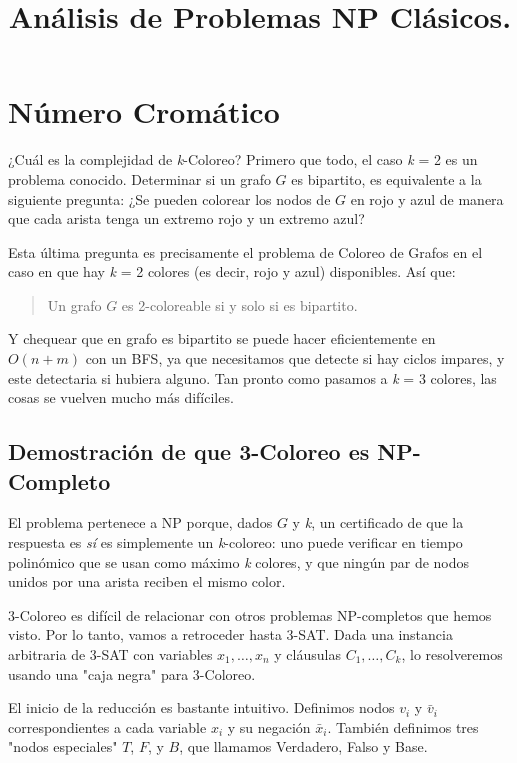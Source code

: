 \documentclass[12pt]{article}
\title{Análisis de Problemas NP Clásicos.}
\author{}
\date{}
\begin{document}
\maketitle

\section*{Número Cromático}

¿Cuál es la complejidad de \textit{k}-Coloreo? Primero que todo, el caso \textit{k} = 2 es un problema conocido. Determinar si un grafo $G$ es bipartito, es equivalente a la siguiente pregunta: ¿Se pueden colorear los nodos de $G$ en rojo y azul de manera que cada arista tenga un extremo rojo y un extremo azul?

Esta última pregunta es precisamente el problema de Coloreo de Grafos en el caso en que hay \textit{k} = 2 colores (es decir, rojo y azul) disponibles. Así que:

\begin{quote}
Un grafo $G$ es 2-coloreable si y solo si es bipartito.
\end{quote}

Y chequear que en grafo es bipartito se puede hacer eficientemente en $O(n+m)$ con un BFS, ya que necesitamos que detecte si hay ciclos impares, y este detectaria si hubiera alguno. Tan pronto como pasamos a \textit{k} = 3 colores, las cosas se vuelven mucho más difíciles.

\subsection*{Demostración de que 3-Coloreo es NP-Completo}

El problema pertenece a NP porque, dados $G$ y \textit{k}, un certificado de que la respuesta es \textit{sí} es simplemente un \textit{k}-coloreo: uno puede verificar en tiempo polinómico que se usan como máximo \textit{k} colores, y que ningún par de nodos unidos por una arista reciben el mismo color.

3-Coloreo es difícil de relacionar con otros problemas NP-completos que hemos visto. Por lo tanto, vamos a retroceder hasta 3-SAT. Dada una instancia arbitraria de 3-SAT con variables $x_1, \ldots, x_n$ y cláusulas $C_1, \ldots, C_k$, lo resolveremos usando una "caja negra" para 3-Coloreo.

El inicio de la reducción es bastante intuitivo. Definimos nodos $v_i$ y $\bar{v}_i$ correspondientes a cada variable $x_i$ y su negación $\bar{x}_i$. También definimos tres "nodos especiales" $T$, $F$, y $B$, que llamamos Verdadero, Falso y Base.
\end{document}
